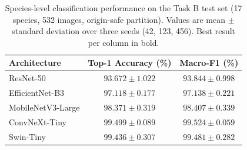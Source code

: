 \begin{table}[t]
\centering
\caption{Species-level classification performance on the Task B test set
(17 species, 532 images, origin-safe partition). Values are mean $\pm$
standard deviation over three seeds (42, 123, 456). Best result per column
in bold.}
\label{tab:task_b}
\begin{tabular}{lcc}
\toprule
\textbf{Architecture} & \textbf{Top-1 Accuracy (\%)} & \textbf{Macro-F1 (\%)} \\
\midrule
ResNet-50          & $93.672 \pm 1.022$ & $93.844 \pm 0.998$ \\
EfficientNet-B3    & $97.118 \pm 0.177$ & $97.138 \pm 0.221$ \\
MobileNetV3-Large  & $98.371 \pm 0.319$ & $98.407 \pm 0.339$ \\
ConvNeXt-Tiny      & $\mathbf{99.499 \pm 0.089}$ & $\mathbf{99.524 \pm 0.059}$ \\
Swin-Tiny          & $99.436 \pm 0.307$ & $99.481 \pm 0.282$ \\
\bottomrule
\end{tabular}
\end{table}
